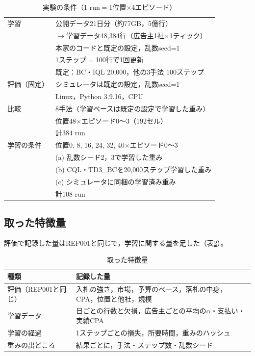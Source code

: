 \documentclass[twocolumn, 10pt]{ujarticle}
\begin{document}
\begin{table}[H]
\centering
\caption{実験の条件（1 run$=$1位置$\times$4エピソード）}
\label{tab:cond}
\footnotesize
\begin{tabularx}{\linewidth}{@{}l>{\raggedright\arraybackslash}X@{}}
\toprule
学習 & 公開データ21日分（約77GB，5億行） \\
 & $\rightarrow$学習データ48,384行（広告主1社$\times$1ティック） \\
 & 本家のコードと既定の設定，乱数seed=1 \\
 & 1ステップ$=$100行で1回更新 \\
 & 既定：BC・IQL 20,000，他の3手法 100ステップ \\
\midrule
評価（固定） & シミュレータは既定の設定，乱数seed=1 \\
 & Linux，Python 3.9.16，CPU \\
\midrule
比較 & 8手法（学習ベースは既定の設定で学習した重み） \\
 & 位置48$\times$エピソード0〜3（192セル） \\
 & 計384 run \\
\midrule
学習の条件 & 位置0, 8, 16, 24, 32, 40$\times$エピソード0〜3 \\
 & (a) 乱数シード2，3で学習した重み \\
 & (b) CQL・TD3\_BCを20,000ステップ学習した重み \\
 & (c) シミュレータに同梱の学習済み重み \\
 & 計108 run \\
\bottomrule
\end{tabularx}
\end{table}

\subsection{取った特徴量}\label{sec:e-feat}

評価で記録した量はREP001と同じで，学習に関する量を足した（表\ref{tab:feat}）。

\begin{table}[H]
\centering
\caption{取った特徴量}
\label{tab:feat}
\footnotesize
\begin{tabularx}{\linewidth}{@{}l>{\raggedright\arraybackslash}X@{}}
\toprule
種類 & 記録した量 \\
\midrule
評価（REP001と同じ） & 入札の強さ，市場，予算のペース，落札の中身，CPA，位置と他社，規模 \\
学習データ & 日ごとの行数と欠損，広告主ごとの平均の$\alpha$・支払い・実績CPA \\
学習の経過 & 1ステップごとの損失，所要時間，重みのハッシュ \\
重みの出どころ & 結果ごとに，手法・ステップ数・乱数シード \\
\bottomrule
\end{tabularx}
\end{table}
\end{document}

